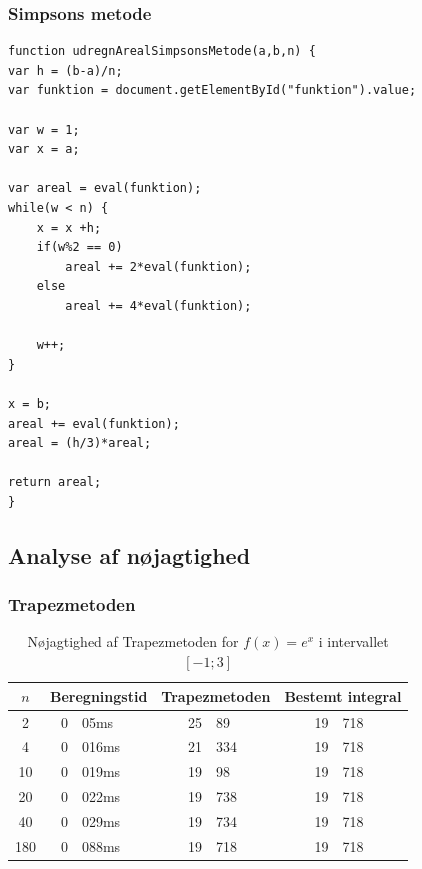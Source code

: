 \documentclass[12pt]{article}
\numberwithin{equation}{section}
\begin{document}
\subsubsection{Simpsons metode}
\begin{lstlisting}[caption="udregnArealSimpsonsMetode()"]
function udregnArealSimpsonsMetode(a,b,n) {
var h = (b-a)/n;
var funktion = document.getElementById("funktion").value;

var w = 1;
var x = a;

var areal = eval(funktion);
while(w < n) {
	x = x +h;
	if(w%2 == 0)
		areal += 2*eval(funktion);
	else
		areal += 4*eval(funktion);
	
	w++;
}

x = b;
areal += eval(funktion);
areal = (h/3)*areal;

return areal;
}
\end{lstlisting}
\subsection{Analyse af nøjagtighed} 
\subsubsection{Trapezmetoden}

\begin{table}[H]
	\caption {Nøjagtighed af Trapezmetoden for $f(x)=e^x$ i intervallet $[-1;3]$} 
\begin{center}
\begin{tabular}{|c|r@{.}l|r @{.} l|r @{.} l|}
	\hline $n$ & \multicolumn{2}{|c|}{Beregningstid} & \multicolumn{2}{|c|}{Trapezmetoden} & \multicolumn{2}{|c|}{Bestemt integral}
	\\
	\hline 2 & 0&05ms & 25&89 & 19&718\\ 
	\hline 4 & 0&016ms & 21&334 & 19&718\\ 
	\hline 10 & 0&019ms & 19&98 & 19&718\\ 
	\hline 20 & 0&022ms & 19&738 & 19&718\\ 
	\hline 40 & 0&029ms & 19&734 & 19&718\\ 
	\hline 180 & 0&088ms & 19&718 & 19&718\\ 
	\hline 
\end{tabular}
\end{center}
\end{table}
\end{document}
